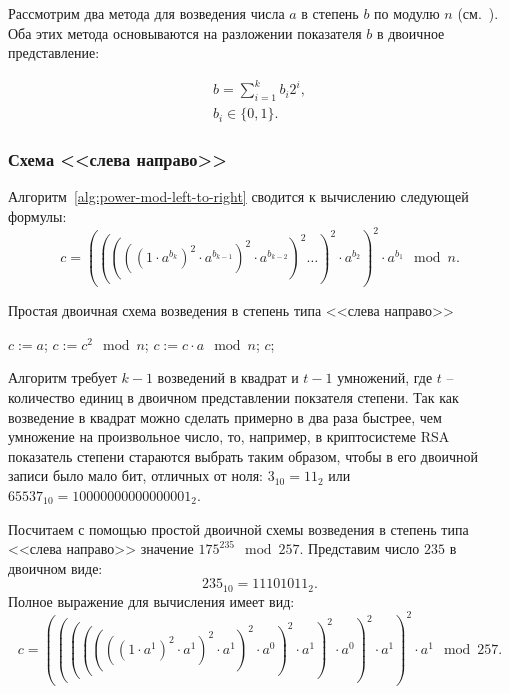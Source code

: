 Рассмотрим два метода для возведения числа $a$ в степень $b$ по модулю $n$ (см.~\cite[9.3.1. Простые двоичные схемы]{Crandall:Pomerance:2011}). Оба этих метода основываются на разложении показателя $b$ в двоичное представление:

\begin{equation}
	\begin{array}{l}
		b = \sum\limits_{i=1}^{k} b_i 2^i, \\
		b_i \in \{0, 1\}.
	\end{array}
	\label{eq:power-mod-b}
\end{equation}

\subsubsection{Схема <<слева направо>>}

Алгоритм~\ref{alg:power-mod-left-to-right} сводится к вычислению следующей формулы:
\[ c = \left( \left( \left( \left( \left( 1 \cdot a^{b_k} \right)^2 \cdot a^{b_{k-1}} \right)^2 \cdot a^{b_{k-2}} \right)^2 \dots \right)^2 \cdot a^{b_2} \right)^2 \cdot a^{b_1} \mod n.\]

\begin{algorithm}[iht]
	\caption{Простая двоичная схема возведения в степень типа <<слева направо>>\label{alg:power-mod-left-to-right}}
	\begin{algorithmic}
		\STATE $c := a$;
			\STATE $c := c^2 \mod n$;
				\STATE $c := c \cdot a \mod n$;
			\ENDIF
		\ENDFOR
		\RETURN $c$;
	\end{algorithmic}
\end{algorithm}

Алгоритм требует $k-1$ возведений в квадрат и $t-1$ умножений, где $t$ -- количество единиц в двоичном представлении покзателя степени. Так как возведение в квадрат можно сделать примерно в два раза быстрее, чем умножение на произвольное число, то, например, в криптосистеме RSA показатель степени стараются выбрать таким образом, чтобы в его двоичной записи было мало бит, отличных от ноля: $3_{10} = 11_{2}$ или $65537_{10} = 10000000000000001_{2}$.

\example Посчитаем с помощью простой двоичной схемы возведения в степень типа <<слева направо>> значение $175^{235} \mod 257$. Представим число $235$ в двоичном виде:
\[ 235_{10} = 11101011_{2}.\]
Полное выражение для вычисления имеет вид:
\[ c = (((((((1 \cdot a^1)^2 \cdot a^1)^2 \cdot a^1)^2 \cdot a^0)^2 \cdot a^1)^2 \cdot a^0)^2 \cdot a^1)^2 \cdot a^1 \mod 257.\]

